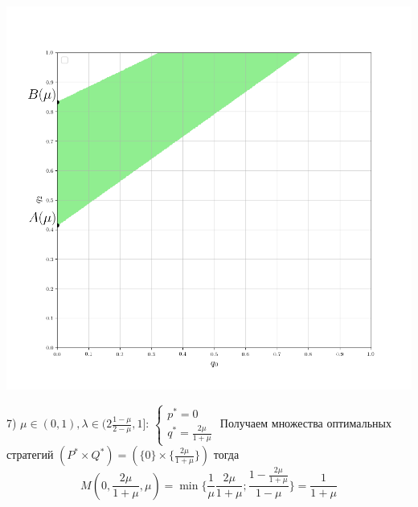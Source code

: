 \documentclass[letterpaper,12pt, reqno]{article}
\begin{document}
\begin{flushleft}
\begin{center}
\includegraphics[scale=0.5]{graf_3_7}
\end{center}
7) $\mu \in (0, 1), \lambda \in (2\frac{1-\mu}{2-\mu}, 1]$: 
$\begin{cases}p^{*} =0 \\ q^{*}=\frac{2\mu}{1+\mu} \end{cases}$
\hfill \break
Получаем множества оптимальных стратегий 
$(P^{*} \times Q^{*}) =(\{0\} \times \{\frac{2\mu}{1+\mu}\})$ тогда
$$M(0, \frac{2\mu}{1+\mu}, \mu)=\min \big\{\frac{1}{\mu}\frac{2\mu}{1+\mu}; 
\frac{1-\frac{2\mu}{1+\mu}}{1-\mu}\big\}=\frac{1}{1+\mu}$$


\end{flushleft}
\end{document}
